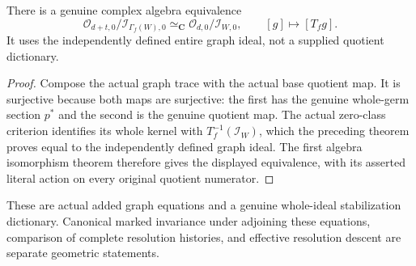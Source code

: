 \begin{theorem}
\label{hir:actual-holomorphic-graph-original-quotient}
\leanok
There is a genuine complex algebra equivalence
\[
 \mathcal O_{d+t,0}/\mathcal I_{\Gamma_f(W),0}
 \simeq_{\mathbf C}\mathcal O_{d,0}/\mathcal I_{W,0},\qquad
 [g]\longmapsto[T_f g].
\]
It uses the independently defined entire graph ideal, not a supplied
quotient dictionary.
\end{theorem}
\begin{proof}
Compose the actual graph trace with the actual base quotient map. It is
surjective because both maps are surjective: the first has the genuine
whole-germ section $p^*$ and the second is the genuine quotient map.
The actual zero-class criterion identifies its whole kernel with
$T_f^{-1}(\mathcal I_W)$, which the preceding theorem proves equal to
the independently defined graph ideal. The first algebra isomorphism
theorem therefore gives the displayed equivalence, with its asserted
literal action on every original quotient numerator.
\end{proof}

These are actual added graph equations and a genuine whole-ideal
stabilization dictionary. Canonical marked invariance under adjoining
these equations, comparison of complete resolution histories, and effective
resolution descent are separate geometric statements.
